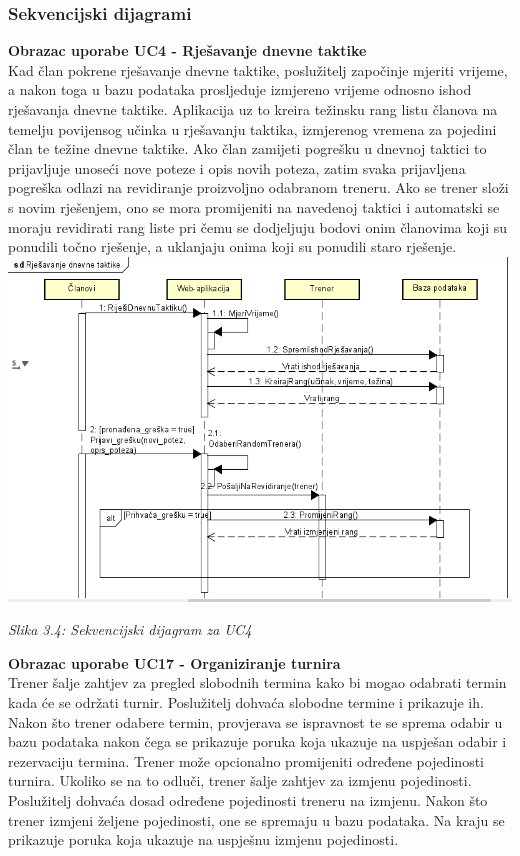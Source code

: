 \documentclass{article}
\begin{document}
		\subsubsection{Sekvencijski dijagrami}
		\textbf{Obrazac uporabe UC4 - Rješavanje dnevne taktike}\\
		Kad član pokrene rješavanje dnevne taktike, poslužitelj započinje mjeriti vrijeme, a nakon toga u bazu podataka prosljeduje izmjereno vrijeme odnosno ishod rješavanja dnevne taktike.
		Aplikacija uz to kreira težinsku rang listu članova na temelju povijensog učinka u rješavanju taktika, izmjerenog vremena za pojedini član te težine dnevne taktike.
		Ako član zamijeti pogrešku u dnevnoj taktici to prijavljuje unoseći nove poteze i opis novih poteza, zatim svaka prijavljena pogreška odlazi na revidiranje proizvoljno odabranom treneru. Ako se trener složi s novim rješenjem, ono se mora promijeniti na navedenoj taktici i automatski se moraju revidirati rang liste pri čemu se dodjeljuju bodovi onim članovima koji su ponudili točno rješenje, a uklanjaju onima koji su ponudili staro rješenje.
		\eject
		\includegraphics[width=\columnwidth]{rjesavanje_dnevnih_taktika}
		\begin{center}
			\textit{Slika 3.4: Sekvencijski dijagram za UC4}
		\end{center}
		\eject
		\textbf{Obrazac uporabe UC17 - Organiziranje turnira}\\
		Trener šalje zahtjev za pregled slobodnih termina kako bi mogao odabrati termin kada će se održati turnir. Poslužitelj dohvaća slobodne termine i prikazuje ih. Nakon što trener odabere termin, provjerava se ispravnost te se sprema odabir u bazu podataka nakon čega se prikazuje poruka koja ukazuje na uspješan odabir i rezervaciju termina. Trener može opcionalno promijeniti određene pojedinosti turnira. Ukoliko se na to odluči, trener šalje zahtjev za izmjenu pojedinosti. Poslužitelj dohvaća dosad određene pojedinosti treneru na izmjenu. Nakon što trener izmjeni željene pojedinosti, one se spremaju u bazu podataka. Na kraju se prikazuje poruka koja ukazuje na uspješnu izmjenu pojedinosti.
\end{document}
